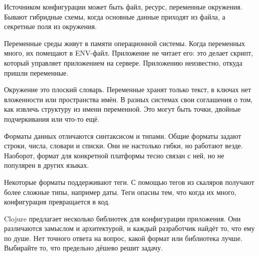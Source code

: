 Источником конфигурации может быть файл, ресурс, переменные окружения. Бывают
гибридные схемы, когда основные данные приходят из файла, а секретные поля из
окружения.

Переменные среды живут в памяти операционной системы. Когда переменных много, их
помещают в ENV-файл. Приложение не читает его: это делает скрипт, который
управляет приложением на сервере. Приложению неизвестно, откуда пришли
переменные.

Окружение это плоский словарь. Переменные хранят только текст, в ключах нет
вложенности или пространства им\"{е}н. В разных системах свои соглашения о том, как
извлечь структуру из имени переменной. Это могут быть точки, двойные
подчеркивания или что-то ещ\"{е}.

Форматы данных отличаются синтаксисом и типами. Общие форматы задают строки,
числа, словари и списки. Они не настолько гибки, но работают везде. Наоборот,
формат для конкретной платформы тесно связан с ней, но не популярен в других
языках.

Некоторые форматы поддерживают теги. С помощью тегов из скаляров получают более
сложные типы, например даты. Теги опасны тем, что когда их много, конфигурация
превращается в код.

Clojure предлагает несколько библиотек для конфигурации приложения. Они
различаются замыслом и архитектурой, и каждый разработчик найд\"{е}т то, что ему по
душе. Нет точного ответа на вопрос, какой формат или библиотека лучше. Выбирайте
то, что предельно д\"{е}шево решит задачу.
